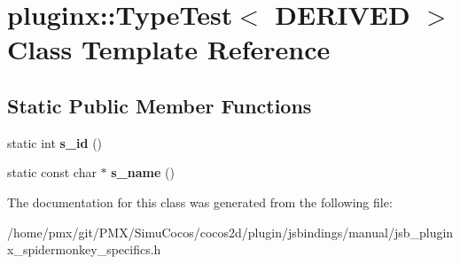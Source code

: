 \hypertarget{classpluginx_1_1TypeTest}{}\section{pluginx\+:\+:Type\+Test$<$ D\+E\+R\+I\+V\+ED $>$ Class Template Reference}
\label{classpluginx_1_1TypeTest}
\subsection*{Static Public Member Functions}
\begin{DoxyCompactItemize}
\item 
\mbox{\label{classpluginx_1_1TypeTest_af47e3966ba971107f8285c278e7eceea}} 
static int {\bfseries s\+\_\+id} ()
\item 
\mbox{\label{classpluginx_1_1TypeTest_a8adbc3fa0df7bb69affe43e77811c3cf}} 
static const char $\ast$ {\bfseries s\+\_\+name} ()
\end{DoxyCompactItemize}


The documentation for this class was generated from the following file\+:\begin{DoxyCompactItemize}
\item 
/home/pmx/git/\+P\+M\+X/\+Simu\+Cocos/cocos2d/plugin/jsbindings/manual/jsb\+\_\+pluginx\+\_\+spidermonkey\+\_\+specifics.\+h\end{DoxyCompactItemize}
